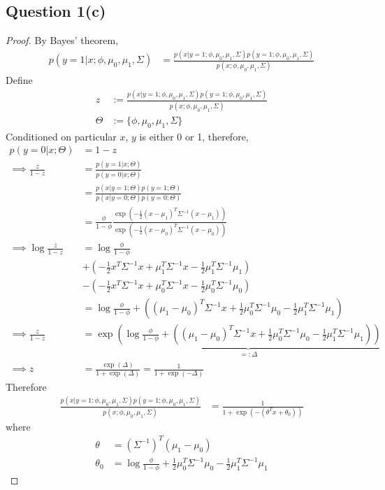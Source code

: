 \documentclass[11pt]{article}
\begin{document}
	\subsection{Question 1(c)}
	\begin{proof}
		By Bayes' theorem,
		\begin{align}
			p(y=1|x; \phi, \mu_0, \mu_1, \Sigma) &= \frac{p(x|y=1; \phi, \mu_0, \mu_1, \Sigma) p(y=1; \phi, \mu_0, \mu_1, \Sigma)}{p(x;\phi, \mu_0, \mu_1, \Sigma)}
		\end{align}
		Define 
		\begin{align}
			z &:= \frac{p(x|y=1; \phi, \mu_0, \mu_1, \Sigma) p(y=1; \phi, \mu_0, \mu_1, \Sigma)}{p(x;\phi, \mu_0, \mu_1, \Sigma)} \\
			\Theta &:= \{\phi, \mu_0, \mu_1, \Sigma\}
		\end{align}
		Conditioned on particular $x$, $y$ is either 0 or 1, therefore,
		\begin{align}
			p(y=0|x; \Theta) &= 1 - z \\
			\implies \frac{z}{1-z} &= \frac{p(y=1|x; \Theta)}{p(y=0|x; \Theta)} \\
			&= \frac{p(x|y=1; \Theta) p(y=1; \Theta)}{p(x|y=0; \Theta) p(y=0; \Theta)} \\
			&= \frac{\phi}{1 - \phi} \frac{\exp\left(-\frac{1}{2} (x-\mu_1)^T \Sigma^{-1} (x - \mu_1)\right)}{\exp\left(-\frac{1}{2} (x-\mu_0)^T \Sigma^{-1} (x - \mu_0)\right)} \\
			\implies \log \frac{z}{1-z} &= \log \frac{\phi}{1-\phi} \\
			&+ \left (-\frac{1}{2} x^T \Sigma^{-1} x + \mu_1^T \Sigma^{-1} x - \frac{1}{2} \mu_1^T \Sigma^{-1} \mu_1 \right) \\
			&- \left (-\frac{1}{2} x^T \Sigma^{-1} x + \mu_0^T \Sigma^{-1} x - \frac{1}{2} \mu_0^T \Sigma^{-1} \mu_0 \right) \\
			&= \log \frac{\phi}{1-\phi} + \left (
			(\mu_1 - \mu_0)^T \Sigma^{-1} x
			+ \frac{1}{2} \mu_0^T \Sigma^{-1} \mu_0 - \frac{1}{2} \mu_1^T \Sigma^{-1} \mu_1
			\right ) \\
			\implies \frac{z}{1-z} &= \exp \underbrace{\left (
			\log \frac{\phi}{1-\phi} + \left (
			(\mu_1 - \mu_0)^T \Sigma^{-1} x
			+ \frac{1}{2} \mu_0^T \Sigma^{-1} \mu_0 - \frac{1}{2} \mu_1^T \Sigma^{-1} \mu_1
			\right )
			\right )}_{=:\Delta} \\
			\implies z &= \frac{\exp(\Delta)}{1+\exp(\Delta)} = \frac{1}{1+\exp(-\Delta)}
		\end{align}
		Therefore
		\begin{align}
			\frac{p(x|y=1; \phi, \mu_0, \mu_1, \Sigma) p(y=1; \phi, \mu_0, \mu_1, \Sigma)}{p(x;\phi, \mu_0, \mu_1, \Sigma)}
			&= \frac{1}{1 + \exp(-(\theta^T x + \theta_0))}
		\end{align}
		where 
		\begin{align}
			\theta &= (\Sigma^{-1})^T (\mu_1 - \mu_0) \\
			\theta_0 &= \log \frac{\phi}{1-\phi} + \frac{1}{2} \mu_0^T \Sigma^{-1} \mu_0 - \frac{1}{2} \mu_1^T \Sigma^{-1} \mu_1
		\end{align}
	\end{proof}
	\newpage
\end{document}
